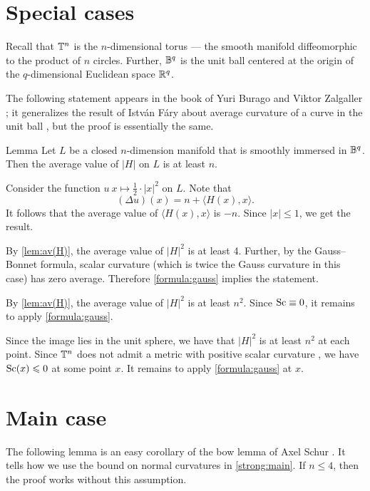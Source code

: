 \documentclass[a4paper,10pt]{article}
\begin{document}
\section{Special cases}

Recall that $\mathbb{T}^n$ is the $n$-dimensional torus --- the smooth manifold diffeomorphic to the product of $n$ circles.
Further, $\mathbb{B}^q$ is the unit ball centered at the origin of the $q$-dimensional Euclidean space $\mathbb{R}^q$.

The following statement appears in the book of Yuri Burago and Viktor Zalgaller \cite[Theorem~28.2.5]{burago-zalgaller};
it generalizes the result of István Fáry about average curvature of a curve in the unit ball \cite{fary,tabachnikov}, but the proof is essentially the same.

\begin{thm}{Lemma}\label{lem:av(H)}
Let $L$ be a closed $n$-dimension manifold that is smoothly immersed in $\mathbb{B}^q$.
Then the average value of $|H|$ on $L$ is at least $n$.
\end{thm}

Consider the function $u\:x\mapsto \tfrac12\cdot |x|^2$ on $L$.
Note that 
\[(\Delta u)(x)=n+ \langle H(x),x\rangle.\]
It follows that the average value of $\langle H(x),x\rangle$ is $-n$.
Since $|x|\le1$, we get the result.
\qeds

By \ref{lem:av(H)}, the average value of $|H|^2$ is at least 4.
Further, by the Gauss--Bonnet formula, scalar curvature (which is twice the Gauss curvature in this case) has zero average.
Therefore \ref{formula:gauss} implies the statement.
\qeds

By \ref{lem:av(H)},
the average value of $|H|^2$ is at least $n^2$.
Since $\mathrm{Sc}\equiv0$, it remains to apply \ref{formula:gauss}.
\qeds

Since the image lies in the unit sphere, we have that $|H|^2$ is at least $n^2$ at each point.
Since $\mathbb{T}^n$ does not admit a metric with positive scalar curvature \cite[Corollary A]{gromov-lawson}, we have $\mathrm{Sc}(x)\leqslant 0$ at some point $x$.
It remains to apply \ref{formula:gauss} at $x$.
\qeds

\section{Main case}

The following lemma is an easy corollary of the bow lemma of Axel Schur \cite{shur,petrunin-zamora}.
It tells how we use the bound on normal curvatures in \ref{strong:main}.
If $n\le4$, then the proof works without this assumption.
\end{document}
